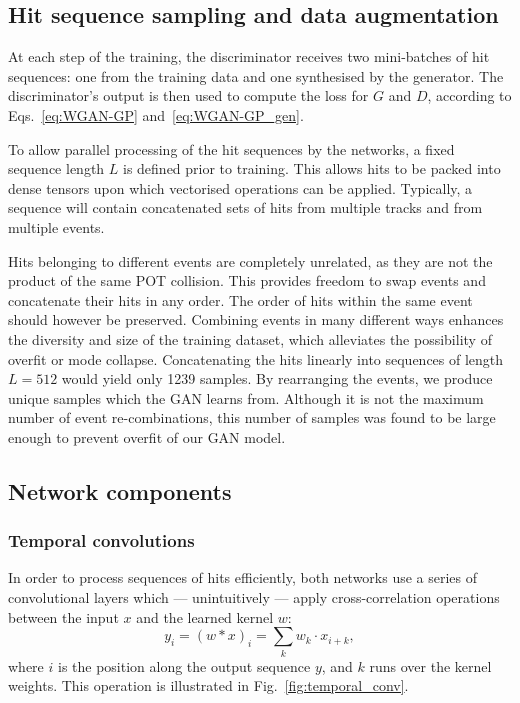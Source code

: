 
\subsection{Hit sequence sampling and data augmentation}
At each step of the training, the discriminator receives two mini-batches of hit sequences: one from the training data and one synthesised by the generator. The discriminator's output is then used to compute the loss for $G$ and $D$, according to Eqs.~\ref{eq:WGAN-GP} and~\ref{eq:WGAN-GP_gen}.

To allow parallel processing of the hit sequences by the networks, a fixed sequence length $L$ is defined prior to training. This allows hits to be packed into dense tensors upon which vectorised operations can be applied. Typically, a sequence will contain concatenated sets of hits from multiple tracks and from multiple events.

Hits belonging to different events are completely unrelated, as they are not the product of the same POT collision. This provides freedom to swap events and concatenate their hits in any order. The order of hits within the same event should however be preserved. %
Combining events in many different ways enhances the diversity and size of the training dataset, which alleviates the possibility of overfit or mode collapse.
Concatenating the  hits linearly into sequences of length $L=512$ would yield only 1239 samples. By rearranging the events, we produce  unique samples which the GAN learns from. Although it is not the maximum number of event re-combinations, this number of samples was found to be large enough to prevent overfit of our GAN model.


\subsection{Network components}

\subsubsection{Temporal convolutions}
In order to process sequences of hits efficiently, both networks use a series of convolutional layers which --- unintuitively --- apply cross-correlation operations between the input $x$ and the learned kernel $w$:
\begin{equation}\label{eq:conv1d}
    y_{i} = (w \ast x)_{i} = \sum_{k} w_k \cdot x_{i+k},
\end{equation}
where $i$ is the position along the output sequence $y$, and $k$ runs over the kernel weights. This operation is illustrated in Fig.~\ref{fig:temporal_conv}.

